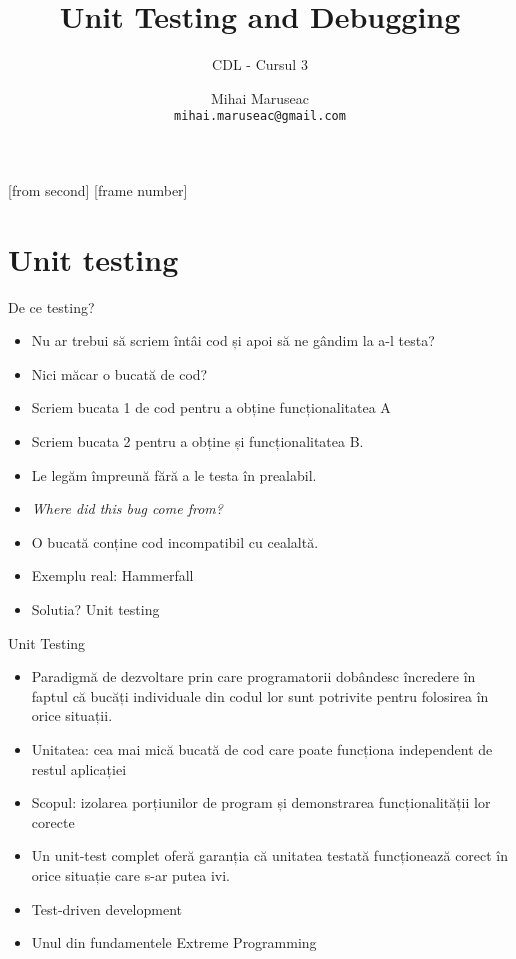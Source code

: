 \documentclass{beamer}
\title[Unit Testing and Debugging]{Unit Testing and Debugging}
\subtitle{CDL - Cursul 3}
\institute{ROSEdu}
\author{Mihai Maruseac \\\texttt{mihai.maruseac@gmail.com}}
\begin{document}
[from second]
[frame number]

\frame{\titlepage}

\frame{\tableofcontents}

\section{Unit testing}
\frame{\tableofcontents[currentsection]}

\begin{frame}{De ce testing?}
\begin{itemize}
\item Nu ar trebui să scriem întâi cod și apoi să ne gândim la a-l testa?
\item \pause Nici măcar o bucată de cod?
\item \pause Scriem bucata 1 de cod pentru a obține funcționalitatea A
\item \pause Scriem bucata 2 pentru a obține și funcționalitatea B.
\item \pause Le legăm împreună fără a le testa în prealabil.
\item \pause \textit{Where did this bug come from?}
\item \pause O bucată conține cod incompatibil cu cealaltă.
\item \pause Exemplu real: \pause Hammerfall
\item \pause Solutia? \pause Unit testing
\end{itemize}
\end{frame}

\begin{frame}{Unit Testing}
\begin{itemize}
\item Paradigmă de dezvoltare prin care programatorii dobândesc încredere în faptul că bucăți individuale din codul lor sunt potrivite pentru folosirea în orice situații.
\item \pause Unitatea: cea mai mică bucată de cod care poate funcționa independent de restul aplicației
\item \pause Scopul: izolarea porțiunilor de program și demonstrarea funcționalității lor corecte
\item \pause Un unit-test complet oferă garanția că unitatea testată funcționează corect în orice situație care s-ar putea ivi.
\item \pause Test-driven development
\item \pause Unul din fundamentele Extreme Programming
\end{itemize}
\end{frame}
\end{document}
